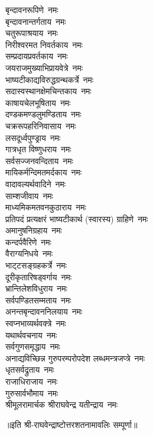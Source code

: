 \begin{flushleft}
\begin{multicols}{2}
बृन्दावनरूपिणे~नमः\\
बृन्दावनान्तर्गताय~नमः\\
चतुरूपाश्रयाय~नमः\\
निरीश्वरमत निवर्तकाय~नमः\\
सम्प्रदायप्रवर्तकाय~नमः\\
जयराजमुख्याभिप्रायवेत्रे~नमः\hfill{}\\
भाष्यटीकाद्यविरुद्धग्रन्थकर्त्रे~नमः\\
सदास्वस्थानक्षेमचिन्तकाय~नमः\\
काषायचेलभूषिताय~नमः\\
दण्डकमण्डलुमण्डिताय~नमः\\
चक्ररूपहरिनिवासाय~नमः\\
लसदूर्ध्वपुण्ड्राय~नमः\\
गात्रधृत विष्णुधराय~नमः\\
सर्वसज्जनवन्दिताय~नमः\\
मायिकर्मन्दिमतमर्दकाय~नमः\\
वादावल्यर्थवादिने~नमः\hfill{}\\
साम्शजीवाय~नमः\\
माध्यमिकमतवनकुठाराय~नमः\\
प्रतिपदं प्रत्यक्षरं भाष्यटीकार्थ (स्वारस्य) ग्राहिणे~नमः\\
अमानुषनिग्रहाय~नमः\\
कन्दर्पवैरिणे~नमः\\
वैराग्यनिधये~नमः\\
भाट्‍टसङ्ग्रहकर्त्रे~नमः\\
दूरीकृतारिषड्वर्गाय~नमः\\
भ्रान्तिलेशविधुराय~नमः\\
सर्वपण्डितसम्मताय~नमः\hfill{}\\
अनन्तबृन्दावननिलयाय~नमः\\
स्वप्नभाव्यर्थवक्त्रे~नमः\\
यथार्थवचनाय~नमः\\
सर्वगुणसमृद्धाय~नमः\\
अनाद्यविच्छिन्न गुरुपरम्परोपदेश लब्धमन्त्रजप्त्रे~नमः\\
धृतसर्वद्रुताय~नमः\\
राजाधिराजाय~नमः\\
गुरुसार्वभौमाय~नमः\\
श्रीमूलरामार्चक श्रीराघवेन्द्र यतीन्द्राय~नमः\\
\end{multicols}
\end{flushleft}

॥इति श्री-राघवेन्द्राष्टोत्तरशतनामावलिः सम्पूर्णा॥
